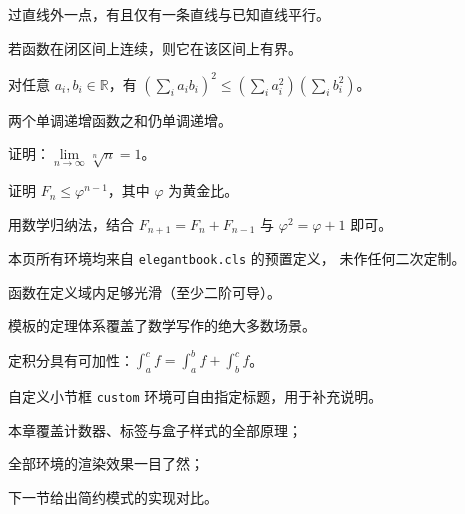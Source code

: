 \begin{postulate}[平行公设]
过直线外一点，有且仅有一条直线与已知直线平行。
\end{postulate}

\begin{corollary}
若函数在闭区间上连续，则它在该区间上有界。
\end{corollary}

\begin{lemma}
对任意 $a_i,b_i\in\mathbb{R}$，有
$\left(\sum_i a_i b_i\right)^2 \leqslant
\left(\sum_i a_i^2\right)\left(\sum_i b_i^2\right)$。
\end{lemma}

\begin{proposition}
两个单调递增函数之和仍单调递增。
\end{proposition}

\begin{exercise}
证明：$\lim\limits_{n\to\infty}\sqrt[n]{n}=1$。
\end{exercise}

\begin{problem}[Fibonacci 界]
证明 $F_n \leqslant \varphi^{n-1}$，其中 $\varphi$ 为黄金比。
\end{problem}

\begin{solution}
用数学归纳法，结合 $F_{n+1}=F_n+F_{n-1}$ 与
$\varphi^2=\varphi+1$ 即可。
\end{solution}

\begin{note}
本页所有环境均来自 \texttt{elegantbook.cls} 的预置定义，
未作任何二次定制。
\end{note}

\begin{assumption}
函数在定义域内足够光滑（至少二阶可导）。
\end{assumption}

\begin{conclusion}
模板的定理体系覆盖了数学写作的绝大多数场景。
\end{conclusion}

\begin{property}
定积分具有可加性：$\int_a^c f = \int_a^b f + \int_b^c f$。
\end{property}

\begin{custom}{自定义小节框}
\texttt{custom} 环境可自由指定标题，用于补充说明。
\end{custom}

\begin{introduction}
\item 本章覆盖计数器、标签与盒子样式的全部原理；
\item 全部环境的渲染效果一目了然；
\item 下一节给出简约模式的实现对比。
\end{introduction}


